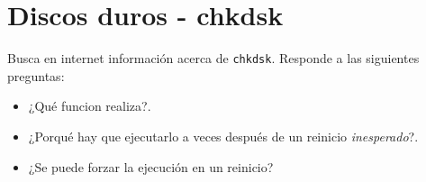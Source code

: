 \documentclass[11pt]{article}
\begin{document}
\section{Discos duros - chkdsk}
\label{sec:orgd389ac4}

Busca en internet información acerca de \texttt{chkdsk}. Responde a las siguientes
preguntas:

\begin{itemize}
\item ¿Qué funcion realiza?.
\item ¿Porqué hay que ejecutarlo a veces después de un reinicio \emph{inesperado}?.
\item ¿Se puede forzar la ejecución en un reinicio?
\end{itemize}
\end{document}
